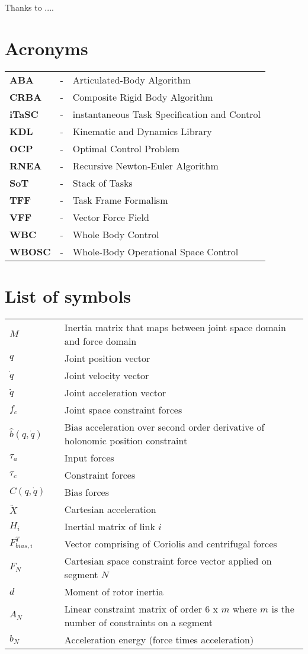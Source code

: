 \documentclass[rnd]{mas_report}
\newcommand\nomenclature[3]{#1 & #2 & #3 \\}
\begin{document}
	
	\begin{acknowledgements}
		Thanks to ....
	\end{acknowledgements}
	
	
	{\hypersetup{hidelinks}
			\tableofcontents
	}
	\listoffigures
	\listoftables

	\newpage
	\chapter*{Acronyms}
	\begin{longtable}{@{}p{2.5cm}@{}p{1cm}@{}p{\dimexpr\textwidth-1cm\relax}@{}}
		\label{aba}\nomenclature{\textbf{ABA}}{-}{Articulated-Body Algorithm }%
		\label{crba}\nomenclature{\textbf{CRBA}}{-}{Composite Rigid Body Algorithm}%
		\nomenclature{\textbf{iTaSC}}{-}{instantaneous Task Specification and Control} \label{itasc}%
		\nomenclature{\textbf{KDL}}{-}{Kinematic and Dynamics Library} \label{kdl} %
	\nomenclature{\textbf{OCP}}{-}{Optimal Control Problem} \label{ocp}%
		\label{rnea}\nomenclature{\textbf{RNEA}}{-}{Recursive Newton-Euler Algorithm}%
		\label{sot}\nomenclature{\textbf{SoT}}{-}{Stack of Tasks}%
		\label{tff}\nomenclature{\textbf{TFF}}{-}{Task Frame Formalism}%
		\label{vff}\nomenclature{\textbf{VFF}}{-}{Vector Force Field}%
		\label{wbc}\nomenclature{\textbf{WBC}}{-}{Whole Body Control}%
		\label{wbosc}\nomenclature{\textbf{WBOSC}}{-}{Whole-Body Operational Space Control}%
		
		
		
	\end{longtable}
	
	\newpage
	\chapter*{List of symbols}
	\begin{longtable}{@{}p{1.8cm}@{}p{1cm}@{}p{\dimexpr\textwidth-1cm\relax}@{}}
		\nomenclature{$M$}{}{Inertia matrix that maps between joint space domain and force domain \setstretch{1.5}} 
		\nomenclature{$q$}{}{Joint position vector}
		\nomenclature{$\dot{q}$}{}{Joint velocity vector}
		\nomenclature{$\ddot{q}$}{}{Joint acceleration vector}
		\nomenclature{$f_c$}{}{Joint space constraint forces}
		\nomenclature{$\hat{b}(q, \dot{q})$}{}{Bias acceleration over second order derivative of holonomic position constraint}
		\nomenclature{$\tau_a$}{}{Input forces}
		\nomenclature{$\tau_c$}{}{Constraint forces}
		\nomenclature{$C(q, \dot{q})$}{}{Bias forces}
		\nomenclature{$\ddot{X}$}{}{Cartesian acceleration}
		\nomenclature{$H_i$}{}{Inertial matrix of link $i$}
		\nomenclature{$F_{bias, i}^T$}{}{Vector comprising of Coriolis and centrifugal forces}
		\nomenclature{$F_N$}{}{Cartesian space constraint force vector applied on segment $N$}
		\nomenclature{$d$}{}{Moment of rotor inertia}
		\nomenclature{$A_N$}{}{Linear constraint matrix of order 6 x $m$ where $m$ is the number of constraints on a segment}
		\nomenclature{$b_N$}{}{Acceleration energy (force times acceleration)}	
	\end{longtable}
	
\end{document}
